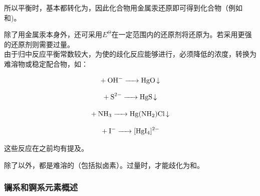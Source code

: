 \documentclass[a4paper,UTF8]{article}
\begin{document}
所以平衡时，基本都转化为，因此化合物用金属汞还原即可得到化合物（例如和)。

除了用金属汞本身外，还可采用$E^{\Theta}$在一定范围内的还原剂将还原为。若采用更强的还原剂则需要过量。\\

由于归中反应平衡常数较大，为使的歧化反应能够进行，必须降低的浓度，转换为难溶物或稳定配合物，如：

$$ \ce{+ OH- -> HgO\ce{v}} $$

$$ \ce{+ S^{2-} -> HgS\ce{v}} $$

$$ \ce{+ NH3 -> Hg(NH2)Cl\ce{v}} $$

$$ \ce{+ I- -> [HgI4]^{2-}} $$

这些反应在之前均有提及。

除了以外，都是难溶的（包括拟卤素）。过量时，才能歧化为\ce{[HgX4^{2-}}和。

\subsubsection{镧系和锕系元素概述}
\end{document}

